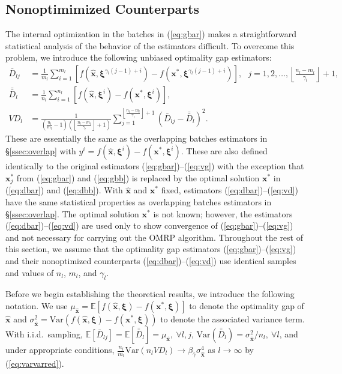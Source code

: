 \documentclass[12pt]{article}
\newcommand{\e}[1]{\mathbb{E} \left[ #1 \right]
}
\newcommand{\var}[1]{\mathrm{Var} \left( #1 \right)}
\newcommand{\x}{\mathbf{x}}
\newcommand{\xh}{{\hat{\x}}}
\newcommand{\xs}{\x^*}
\newcommand{\xit}{\boldsymbol{\xi}}
\newcommand{\xiti}{\xit^i}
\newcommand{\nbl}{\left\lfloor\tfrac{n_l-m_l}{\gamma_l}\right\rfloor+1}
\newcommand{\gammab}{\bar{\gamma}}
\newcommand{\db}{\bar{D}}
\newcommand{\dbb}{\bar{\db}}
\begin{document}
\subsection{Nonoptimimized Counterparts}
\label{subsec:nonO}

The internal optimization in the batches in (\ref{eq:gbar}) makes a straightforward statistical analysis of the behavior of the estimators difficult.  
To overcome this problem, we introduce the following unbiased optimality gap estimators:
\begin{align}
	\db_{lj} & = \frac{1}{m_l} \sum_{i=1}^{m_l} \left[ f(\xh,\xit^{\gamma_l(j-1)+i}) - f(\xs,\xit^{\gamma_l(j-1)+i}) \right],\ \ \ j = 1, 2, \dots, \nbl, \label{eq:dbar} \\
	\dbb_l & = \frac{1}{n_l} \sum_{i=1}^{n_l} \left[ f(\xh,\xiti) - f(\xs,\xiti) \right], \label{eq:dbb} \\
	VD_l & = \frac{1}{\left( \tfrac{n_l}{m_l} - 1 \right) \left(\nbl\right)} \sum_{j=1}^{\nbl} (\db_{lj} - \dbb_l)^2. \label{eq:vd}
\end{align}
These are essentially the same as the overlapping batches estimators in \S \ref{ssec:overlap} with $y^i = f(\xh,\xiti) - f(\xs,\xiti)$.  
These are also defined identically to the original estimators (\ref{eq:gbar})--(\ref{eq:vg}) with the exception that $\xs_j$ from (\ref{eq:gbar}) and (\ref{eq:gbb}) is replaced by the optimal solution $\xs$ in (\ref{eq:dbar}) and (\ref{eq:dbb}).  
With $\xh$ and $\xs$ fixed, estimators (\ref{eq:dbar})--(\ref{eq:vd}) have the same statistical properties as overlapping batches estimators in \S \ref{ssec:overlap}.  
The optimal solution $\xs$ is not known; however, the estimators (\ref{eq:dbar})--(\ref{eq:vd}) are used only to show convergence of (\ref{eq:gbar})--(\ref{eq:vg}) and not necessary for carrying out the OMRP algorithm.  
Throughout the rest of this section, we assume that the optimality gap estimators (\ref{eq:gbar})--(\ref{eq:vg}) and their nonoptimized counterparts (\ref{eq:dbar})--(\ref{eq:vd}) use identical samples and values of $n_
l$, $m_l$, and $\gamma_l$.  \smallskip 

Before we begin establishing the theoretical results, we introduce the following notation. 
We use $\mu_{\xh} = \e{f(\xh,\xit) - f(\xs,\xit)}$ to denote the optimality gap of $\xh$ and $\sigma^2_{\xh} = \var{f(\xh,\xit) - f(\xs,\xit)}$ to denote the associated variance term.
With i.i.d.\ sampling, $\e{\db_{lj}}=\e{\dbb_l}=\mu_{\xh}, \ \forall l,j$, $\mathrm{Var}(\dbb_l)=\sigma^2_{\xh}/n_l, \ \forall l$, and under appropriate conditions, $\frac{n_l}{m_l} \var{n_l VD_l} \rightarrow \beta_{\gammab} \sigma^4_{\xh}$ as $l \rightarrow \infty$  by (\ref{eq:varvarred}). 
\end{document}
